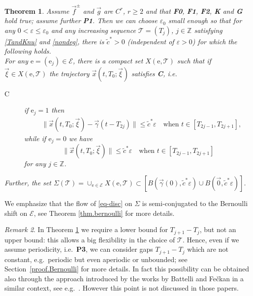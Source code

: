 \documentclass[10pt]{article}
\numberwithin{equation}{section}
\def\ga{\vec{\gamma}}
\def\ep{\varepsilon}
\def\Z{{\mathbb Z}}
\def\ee{{\mathrm e}}
\def\EE{{\mathcal E}}
\def\TT{{\mathcal T}}
\def\xxi{\vec{\xi}}
\def\x{\vec{x}}
\def\f{\vec{f}}
\def\g{\vec{g}}
\newcommand\assump[1]{{\rm\textbf{#1}}}
\newtheorem{theorem}{Theorem}[section]
\theoremstyle{definition}
\theoremstyle{remark}
\newtheorem{remark}[theorem]{Remark}
\begin{document}
\begin{theorem}\label{main.periodic1}
	Assume    $\f^{\pm}$ and $\g$ are $C^r$, $r \ge 2$ and that \assump{F0}, \assump{F1}, \assump{F2}, \assump{K} and \assump{G} hold true; assume further
\assump{P1}.
Then we can choose $\ep_0$ small enough so that for any $0< \ep \le \ep_0$
and any increasing sequence $\mathcal{T}=(T_j)$, $j \in \Z$  satisfying  \eqref{TandKnu} and \eqref{nondeg},
 there is $\tilde{c}^*>0$ (independent of $\ep>0$)
for which the following holds.
\\
For any  $\ee=(\ee_j) \in \EE$,
 there is a compact set $X(\ee, \mathcal{T})$
   such that if $\xxi\in X(\ee, \mathcal{T})$ the trajectory $\x(t,T_{0}; \xxi)$    satisfies \textbf{C}, i.e.
  \begin{description}
  \item[C]
	if $\ee_j=1$ then
	\begin{equation}\label{ej=1}
	\begin{split}
	&   \|\x(t,T_{0}; \xxi)-\ga(t-T_{2j}) \| \le \tilde{c}^*\ep \quad \textrm{when $t \in [T_{2j-1}, T_{2j+1} ]$,}
	\end{split}
	\end{equation}
	while  if $\ee_j=0$ we have
	\begin{equation}\label{ej=0}
	\|\x(t,T_{0}; \xxi)  \| \le \tilde{c}^*\ep  \quad \textrm{when $t \in [T_{2j-1}, T_{2j+1} ] $}
	\end{equation}
	for any $j \in \Z$.
\end{description}
Further, the set
$\Sigma(\TT) = \cup_{\ee \in \EE} X(\ee, \mathcal{T}) \subset [B(\ga(0), \tilde{c}^* \ep) \cup
B(\vec{0}, \tilde{c}^* \ep)]$.
\end{theorem}





We emphasize that the flow of \eqref{eq-disc} on $\Sigma$   is semi-conjugated to the Bernoulli shift on $\EE$, see Theorem \ref{thm.bernoulli}  for more details.




\begin{remark}\label{explainP}
In Theorem   \ref{main.periodic1} we require a lower bound
for $ T_{j+1}-T_j$, but not an upper bound: this allows a big flexibility in the choice of $\TT$.
 Hence,
even if we assume periodicity, i.e.\ \assump{P3}, we can consider gaps $ T_{j+1}-T_j$ which are not constant, e.g.\ periodic but even aperiodic or unbounded; see Section~\ref{proof.Bernoulli} for more details.
In fact this possibility can be obtained also through the approach
introduced by the works by Battelli and Fe\v ckan in a similar context, see e.g.\ \cite{BF10,BF11,BF12}.
However this point is not discussed in those papers.
\end{remark}
\end{document}
